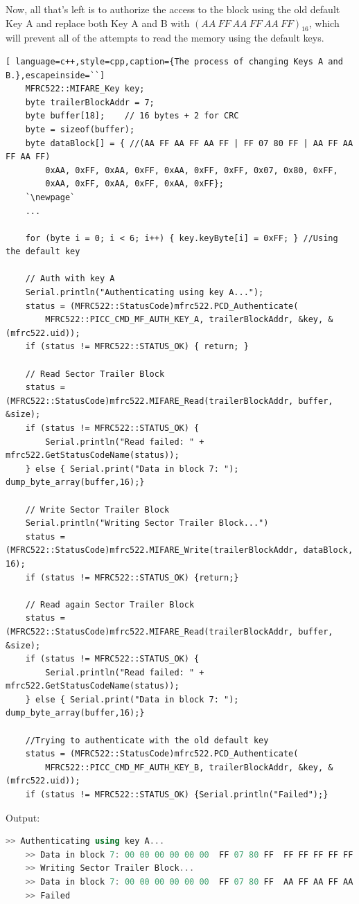 \documentclass[target=bach,aauheader=,style=]{thud}
\begin{document}
Now, all that's left is to authorize the access to the block using the old default Key A and replace both Key A and B with $(AA\ FF\ AA\ FF\ AA\ FF)_{16}$, which will prevent all of the attempts to read the memory using the default keys.
\begin{lstlisting}[ language=c++,style=cpp,caption={The process of changing Keys A and B.},escapeinside=``]
	MFRC522::MIFARE_Key key;
	byte trailerBlockAddr = 7;
	byte buffer[18]; 	// 16 bytes + 2 for CRC
	byte = sizeof(buffer);
	byte dataBlock[] = { //(AA FF AA FF AA FF | FF 07 80 FF | AA FF AA FF AA FF)
		0xAA, 0xFF, 0xAA, 0xFF, 0xAA, 0xFF,	0xFF, 0x07, 0x80, 0xFF, 
		0xAA, 0xFF, 0xAA, 0xFF, 0xAA, 0xFF};
	`\newpage`
	...
	
	for (byte i = 0; i < 6; i++) { key.keyByte[i] = 0xFF; } //Using the default key
	
	// Auth with key A
	Serial.println("Authenticating using key A...");
	status = (MFRC522::StatusCode)mfrc522.PCD_Authenticate(
		MFRC522::PICC_CMD_MF_AUTH_KEY_A, trailerBlockAddr, &key, &(mfrc522.uid));
	if (status != MFRC522::STATUS_OK) {	return; }
	
	// Read Sector Trailer Block 
	status = (MFRC522::StatusCode)mfrc522.MIFARE_Read(trailerBlockAddr, buffer, &size);
	if (status != MFRC522::STATUS_OK) {
		Serial.println("Read failed: " + mfrc522.GetStatusCodeName(status));
	} else { Serial.print("Data in block 7: ");	dump_byte_array(buffer,16);}
		
	// Write Sector Trailer Block
	Serial.println("Writing Sector Trailer Block...")
	status = (MFRC522::StatusCode)mfrc522.MIFARE_Write(trailerBlockAddr, dataBlock, 16);
	if (status != MFRC522::STATUS_OK) {return;}
	
	// Read again Sector Trailer Block
	status = (MFRC522::StatusCode)mfrc522.MIFARE_Read(trailerBlockAddr, buffer, &size);
	if (status != MFRC522::STATUS_OK) {
		Serial.println("Read failed: " + mfrc522.GetStatusCodeName(status));
	} else { Serial.print("Data in block 7: ");	dump_byte_array(buffer,16);}
	
	//Trying to authenticate with the old default key
	status = (MFRC522::StatusCode)mfrc522.PCD_Authenticate(
		MFRC522::PICC_CMD_MF_AUTH_KEY_B, trailerBlockAddr, &key, &(mfrc522.uid));
	if (status != MFRC522::STATUS_OK) {Serial.println("Failed");}
\end{lstlisting}
Output:
\begin{lstlisting}[language=c++,style=output]
	>> Authenticating using key A...
	>> Data in block 7: 00 00 00 00 00 00  FF 07 80 FF  FF FF FF FF FF FF
	>> Writing Sector Trailer Block...
	>> Data in block 7: 00 00 00 00 00 00  FF 07 80 FF  AA FF AA FF AA FF
	>> Failed
\end{lstlisting}
\end{document}
